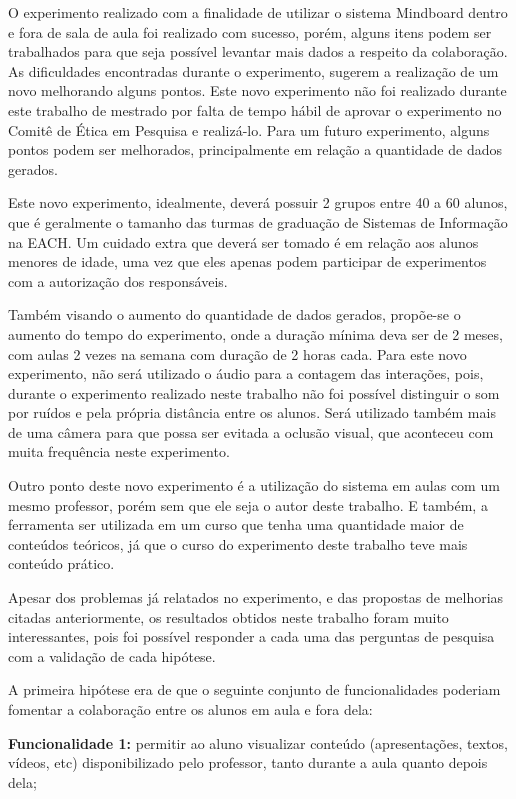 O experimento realizado com a finalidade de utilizar o sistema Mindboard dentro e fora de sala de aula foi realizado com sucesso, porém, alguns itens podem ser trabalhados para que seja possível levantar mais dados a respeito da colaboração. As dificuldades encontradas durante o experimento, sugerem a realização de um novo melhorando alguns pontos. Este novo experimento não foi realizado durante este trabalho de mestrado por falta de tempo hábil de aprovar o experimento no Comitê de Ética em Pesquisa e realizá-lo. Para um futuro experimento, alguns pontos podem ser melhorados, principalmente em relação a quantidade de dados gerados.

Este novo experimento, idealmente, deverá possuir 2 grupos entre 40 a 60 alunos, que é geralmente o tamanho das turmas de graduação de Sistemas de Informação na EACH. Um cuidado extra que deverá ser tomado é em relação aos alunos menores de idade, uma vez que eles apenas podem participar de experimentos com a autorização dos responsáveis.

Também visando o aumento do quantidade de dados gerados, propõe-se o aumento do tempo do experimento, onde a duração mínima deva ser de 2 meses, com aulas 2 vezes na semana com duração de 2 horas cada. Para este novo experimento, não será utilizado o áudio para a contagem das interações, pois, durante o experimento realizado neste trabalho não foi possível distinguir o som por ruídos e pela própria distância entre os alunos. Será utilizado também mais de uma câmera para que possa ser evitada a oclusão visual, que aconteceu com muita frequência neste experimento.

Outro ponto deste novo experimento é a utilização do sistema em aulas com um mesmo professor, porém sem que ele seja o autor deste trabalho. E também, a ferramenta ser utilizada em um curso que tenha uma quantidade maior de conteúdos teóricos, já que o curso do experimento deste trabalho teve mais conteúdo prático.

Apesar dos problemas já relatados no experimento, e das propostas de melhorias citadas anteriormente, os resultados obtidos neste trabalho foram muito interessantes, pois foi possível responder a cada uma das perguntas de pesquisa com a validação de cada hipótese.

A primeira hipótese era de que o seguinte conjunto de funcionalidades poderiam fomentar a colaboração entre os alunos em aula e fora dela:

\textbf{Funcionalidade 1:} permitir ao aluno visualizar conteúdo (apresentações, textos, vídeos, etc) disponibilizado pelo professor, tanto durante a aula quanto depois dela;

